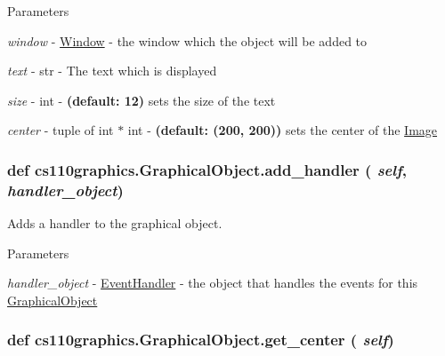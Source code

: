 \begin{DoxyParams}{Parameters}
\item[{\em window}]-\/ \hyperlink{classcs110graphics_1_1Window}{Window} -\/ the window which the object will be added to \item[{\em text}]-\/ str -\/ The text which is displayed \item[{\em size}]-\/ int -\/ {\bfseries (default: 12)} sets the size of the text \item[{\em center}]-\/ tuple of int $\ast$ int -\/ {\bfseries (default: (200, 200))} sets the center of the \hyperlink{classcs110graphics_1_1Image}{Image} \end{DoxyParams}
\hypertarget{classcs110graphics_1_1GraphicalObject_adb1af0d5a6baae3f9a08d21a3227c49f}{
\subsubsection[{add\_\-handler}]{\setlength{\rightskip}{0pt plus 5cm}def cs110graphics.GraphicalObject.add\_\-handler ( {\em self}, \/   {\em handler\_\-object})}}
\label{classcs110graphics_1_1GraphicalObject_adb1af0d5a6baae3f9a08d21a3227c49f}


Adds a handler to the graphical object. 
\begin{DoxyParams}{Parameters}
\item[{\em handler\_\-object}]-\/ \hyperlink{classcs110graphics_1_1EventHandler}{EventHandler} -\/ the object that handles the events for this \hyperlink{classcs110graphics_1_1GraphicalObject}{GraphicalObject} \end{DoxyParams}
\hypertarget{classcs110graphics_1_1GraphicalObject_a062789c4cc9de38af32dcc4ff2058607}{
\subsubsection[{get\_\-center}]{\setlength{\rightskip}{0pt plus 5cm}def cs110graphics.GraphicalObject.get\_\-center ( {\em self})}}
\label{classcs110graphics_1_1GraphicalObject_a062789c4cc9de38af32dcc4ff2058607}


